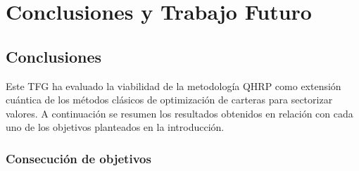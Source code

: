 \chapter{Conclusiones y Trabajo Futuro}
\label{cap:conclusiones}

\section{Conclusiones}
\label{sec:conclusiones}

Este TFG ha evaluado la viabilidad de la metodología \gls{QHRP} como extensión cuántica de los métodos clásicos de optimización de carteras para sectorizar valores. A continuación se resumen los resultados obtenidos en relación con cada uno de los objetivos planteados en la introducción.

\subsection{Consecución de objetivos}
\label{subsec:consecucion_objetivos}

